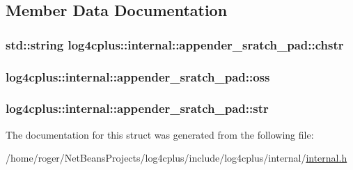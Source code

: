 \subsection{Member Data Documentation}
\hypertarget{structlog4cplus_1_1internal_1_1appender__sratch__pad_a451c609cb08beff734b82c65856a276b}{
\subsubsection[{chstr}]{\setlength{\rightskip}{0pt plus 5cm}std\-::string log4cplus\-::internal\-::appender\-\_\-sratch\-\_\-pad\-::chstr}}\label{structlog4cplus_1_1internal_1_1appender__sratch__pad_a451c609cb08beff734b82c65856a276b}
\hypertarget{structlog4cplus_1_1internal_1_1appender__sratch__pad_a55b1d81390e6513bd5340b742e5e2e16}{
\subsubsection[{oss}]{ log4cplus\-::internal\-::appender\-\_\-sratch\-\_\-pad\-::oss}}\label{structlog4cplus_1_1internal_1_1appender__sratch__pad_a55b1d81390e6513bd5340b742e5e2e16}
\hypertarget{structlog4cplus_1_1internal_1_1appender__sratch__pad_aac7ecc8ba7d0327d6089393af130a5e0}{
\subsubsection[{str}]{ log4cplus\-::internal\-::appender\-\_\-sratch\-\_\-pad\-::str}}\label{structlog4cplus_1_1internal_1_1appender__sratch__pad_aac7ecc8ba7d0327d6089393af130a5e0}


The documentation for this struct was generated from the following file\-:\begin{DoxyCompactItemize}
\item 
/home/roger/\-Net\-Beans\-Projects/log4cplus/include/log4cplus/internal/\hyperlink{internal_8h}{internal.\-h}\end{DoxyCompactItemize}
